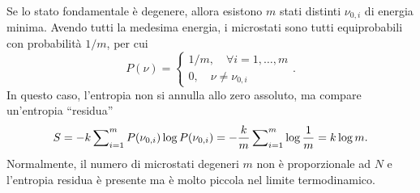 \begin{caso}
    Se lo stato fondamentale è degenere, allora esistono $m$ stati distinti $\nu_{0,i}$ di energia minima. Avendo tutti la medesima energia, i microstati sono tutti equiprobabili con probabilità $1/m$, per cui
    \begin{equation}
        P(\nu) = 
        \begin{cases}
            1/m,\quad \forall i =1,\dots,m \\
            0,\quad \nu \neq \nu_{0,i}
        \end{cases}.
    \end{equation}
    In questo caso, l'entropia non si annulla allo zero assoluto, ma compare un'entropia ``residua''
    \begin{equation}
        S = -k\sum\nolimits_{i = 1}^mP(\nu_{0,i})\log{P(\nu_{0,i})} = -\frac{k}{m}\sum\nolimits_{i = 1}^m\log{\frac{1}{m}} = k\log{m}.
    \end{equation}
    Normalmente, il numero di microstati degeneri $m$ non è proporzionale ad $N$ e l'entropia residua è presente ma è molto piccola nel limite termodinamico.
\end{caso}

